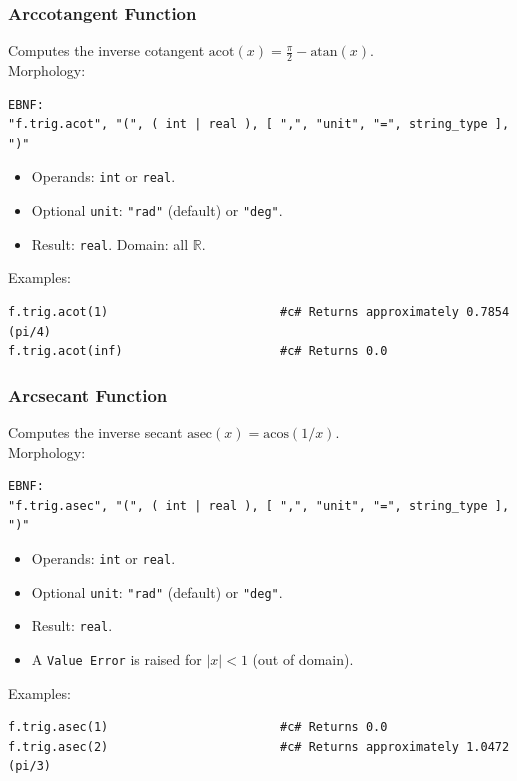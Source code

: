 \subsubsection{Arccotangent Function}
Computes the inverse cotangent $\text{acot}(x) = \frac{\pi}{2} - \text{atan}(x)$. \\
Morphology:
\begin{verbatim}
EBNF:
"f.trig.acot", "(", ( int | real ), [ ",", "unit", "=", string_type ], ")"
\end{verbatim}
\begin{itemize}
\item Operands: \texttt{int} or \texttt{real}.
\item Optional \texttt{unit}: \texttt{"rad"} (default) or \texttt{"deg"}.
\item Result: \texttt{real}. Domain: all $\mathbb{R}$.
\end{itemize}
Examples:
\begin{verbatim}
f.trig.acot(1)                        #c# Returns approximately 0.7854 (pi/4)
f.trig.acot(inf)                      #c# Returns 0.0
\end{verbatim}

\subsubsection{Arcsecant Function}
Computes the inverse secant $\text{asec}(x) = \text{acos}(1/x)$. \\
Morphology:
\begin{verbatim}
EBNF:
"f.trig.asec", "(", ( int | real ), [ ",", "unit", "=", string_type ], ")"
\end{verbatim}
\begin{itemize}
\item Operands: \texttt{int} or \texttt{real}.
\item Optional \texttt{unit}: \texttt{"rad"} (default) or \texttt{"deg"}.
\item Result: \texttt{real}.
\item A \texttt{Value Error} is raised for $|x| < 1$ (out of domain).
\end{itemize}
Examples:
\begin{verbatim}
f.trig.asec(1)                        #c# Returns 0.0
f.trig.asec(2)                        #c# Returns approximately 1.0472 (pi/3)
\end{verbatim}

